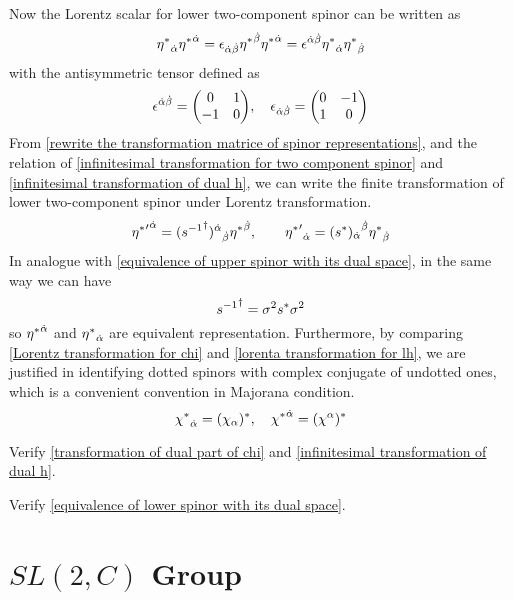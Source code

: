 Now the Lorentz scalar for lower two-component spinor can be written as
\begin{equation}
  {\eta^*}_{\dot{\alpha}}{\eta^*}^{\dot{\alpha}}
= \epsilon_{\dot{\alpha}\dot{\beta}}{\eta^*}^{\dot{\beta}}{\eta^*}^{\dot{\alpha}}
= \epsilon^{\dot{\alpha}\dot{\beta}}{\eta^*}_{\dot{\alpha}}{\eta^*}_{\dot{\beta}}
\end{equation}
with the antisymmetric tensor defined as
\begin{equation}\label{definition of dotted antisymmetric tensor}
  \e^{\doa\dob} = \mqty(0 & 1 \\ -1 & 0),\quad
\e_{\doa\dob} =\mqty(0 & -1 \\ 1 & 0)
\end{equation}
From \eqref{rewrite the transformation matrice of spinor representations}, and the relation of \eqref{infinitesimal transformation for two component spinor} and \eqref{infinitesimal transformation of dual h}, we can write the finite transformation of lower two-component spinor under Lorentz transformation.
\begin{equation} \label{lorenta transformation for lh}
{{\eta^*}'}^{\dot{\alpha}} = {({s^{-1}}^{\dagger})^{\dot{\alpha}}}_{\dot{\beta}}{\eta^*}^{\dot{\beta}}
,\qquad
{{\eta^*}'}_{\dot{\alpha}} = {(s^{*})_{\dot{\alpha}}}^{\dot{\beta}}{\eta^*}_{\dot{\beta}}
\end{equation}
In analogue with \eqref{equivalence of upper spinor with its dual space}, in the same way we can have
\begin{equation} \label{equivalence of lower spinor with its dual space}
{s^{-1}}^{\dagger} = \sigma^2 s^* \sigma^2
\end{equation}
so ${\eta^*}^{\dot{\alpha}}$ and ${\eta^*}_{\dot{\alpha}}$ are equivalent representation.
Furthermore, by comparing \eqref{Lorentz transformation for chi} and \eqref{lorenta transformation for lh}, we are justified in identifying dotted spinors with complex conjugate of undotted ones, which is a convenient convention in Majorana condition.
\begin{equation}
  {\chi^*}_{\dot{\alpha}} = (\chi_{\alpha})^*
,\quad
{\chi^*}^{\dot{\alpha}} = (\chi^{\alpha})^*
\end{equation}

\begin{Exe}
Verify \eqref{transformation of dual part of chi} and \eqref{infinitesimal transformation of dual h}.
\end{Exe}

\begin{Exe}
Verify \eqref{equivalence of lower spinor with its dual space}.
\end{Exe}

\section{$SL(2,C)$ Group}

